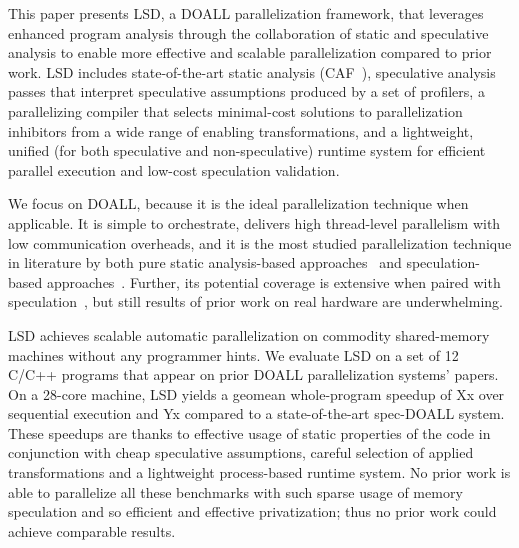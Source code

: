 This paper presents LSD, a DOALL parallelization framework, that leverages
enhanced program analysis through the collaboration of static and speculative
analysis to enable more effective and scalable parallelization compared to prior
work.
%
%
LSD includes state-of-the-art static analysis (CAF~\cite{johnson:cgo:17}),
speculative analysis passes that interpret speculative assumptions produced by a
set of profilers, a parallelizing
compiler that selects minimal-cost solutions to parallelization inhibitors from
a wide range of enabling transformations, and a lightweight, unified (for both
speculative and non-speculative) runtime system for efficient parallel execution
and low-cost speculation validation.
%

We focus on DOALL, because it is the ideal parallelization technique when
applicable. It is simple to orchestrate, delivers high thread-level parallelism
with low communication overheads, and it is the most studied parallelization
technique in literature by both pure static analysis-based
approaches~\cite{..,.,..} and speculation-based approaches~\cite{..,..,..,..}.
Further, its potential coverage is extensive when paired with
speculation~\cite{zhong:08:hpca}, but still results of prior work on real
hardware are underwhelming.

LSD achieves scalable automatic parallelization on commodity shared-memory
machines without any programmer hints.  We evaluate LSD on a set of 12 C/C++
programs that appear on prior DOALL parallelization systems' papers. On a
28-core machine, LSD yields a geomean whole-program speedup of Xx over
sequential execution and Yx compared to a state-of-the-art spec-DOALL system.
These speedups are thanks to effective usage of static properties of the code in
conjunction with cheap speculative assumptions, careful selection of applied
transformations and a lightweight process-based runtime system.  No prior work
is able to parallelize all these benchmarks with such sparse usage of memory
speculation and so efficient and effective privatization; thus no prior work
could achieve comparable results.
